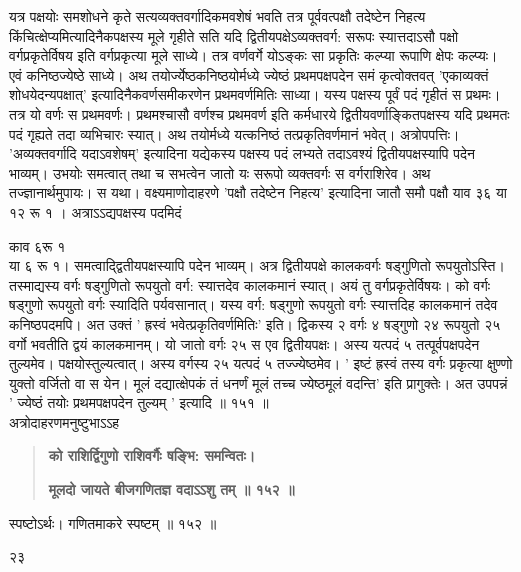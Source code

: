 \documentclass[11pt, openany]{book}
\begin{document}
\begin{sloppypar}
\hangindent=0.2in \hspace{0.2in}यत्र पक्षयोः समशोधने कृते सत्यव्यक्तवर्गादिकमवशेषं भवति तत्र पूर्ववत्पक्षौ तदेष्टेन निहत्य किंचित्क्षेप्यमित्यादिनैकपक्षस्य मूले गृहीते सति यदि द्वितीयपक्षेऽव्यक्तवर्ग: सरूपः स्यात्तदाऽसौ पक्षो वर्गप्रकृतेर्विषय इति वर्गप्रकृत्या मूले साध्ये। तत्र वर्णवर्गे योऽङ्कः सा प्रकृतिः कल्प्या रूपाणि क्षेपः कल्प्यः। एवं कनिष्ठज्येष्ठे साध्ये। अथ तयोर्ज्येष्ठकनिष्ठयोर्मध्ये ज्येष्ठं प्रथमपक्षपदेन समं कृत्वोक्तवत् 'एकाव्यक्तं शोधयेदन्यपक्षात्' इत्यादिनैकवर्णसमीकरणेन प्रथमवर्णमितिः साध्या। यस्य पक्षस्य पूर्वं पदं गृहीतं स प्रथमः। तत्र यो वर्णः स प्रथमवर्णः। प्रथमश्चासौ वर्णश्च प्रथमवर्ण इति कर्मधारये द्वितीयवर्णाङ्कितपक्षस्य यदि प्रथमतः पदं गृह्यते तदा व्यभिचारः स्यात्। अथ तयोर्मध्ये यत्कनिष्ठं तत्प्रकृतिवर्णमानं भवेत्। अत्रोपपत्तिः। 'अव्यक्तवर्गादि यदाऽवशेषम्' इत्यादिना यद्येकस्य पक्षस्य पदं लभ्यते तदाऽवश्यं द्वितीयपक्षस्यापि पदेन भाव्यम्। उभयोः समत्वात् तथा च सभत्वेन जातो यः सरूपो व्यक्तवर्गः स वर्गराशिरेव। अथ तज्ज्ञानार्थमुपायः। स यथा। वक्ष्यमाणोदाहरणे 'पक्षौ तदेष्टेन निहत्य' इत्यादिना जातौ समौ पक्षौ याव ३६ या १२ रू १ । अत्राऽऽद्यपक्षस्य पदमिदं

\hspace{3in}काव ६\hspace{0.5in}रू १\\

\hangindent=0.2in या ६ रू १। समत्वाद्द्वितीयपक्षस्यापि पदेन भाव्यम्। अत्र द्वितीयपक्षे कालकवर्गः षड्गुणितो रूपयुतोऽस्ति। तस्माद्यस्य वर्गः षड्गुणितो रूपयुतो वर्ग: स्यात्तदेव कालकमानं स्यात्। अयं तु वर्गप्रकृतेर्विषयः। को वर्गः षड्गुणो रूपयुतो वर्गः स्यादिति पर्यवसानात्। यस्य वर्ग: षड्गुणो रूपयुतो वर्गः स्यात्तदिह कालकमानं तदेव कनिष्ठपदमपि। अत उक्तं ' ह्रस्वं भवेत्प्रकृतिवर्णमितिः' इति। द्विकस्य २ वर्गः ४ षड्गुणो २४ रूपयुतो २५ वर्गो भवतीति द्वयं कालकमानम्। यो जातो वर्गः २५ स एव द्वितीयपक्षः। अस्य यत्पदं ५ तत्पूर्वपक्षपदेन तुल्यमेव। पक्षयोस्तुल्यत्वात्। अस्य वर्गस्य २५ यत्पदं ५ तज्ज्येष्ठमेव। ' इष्टं ह्रस्वं तस्य वर्गः प्रकृत्या क्षुण्णो युक्तो वर्जितो वा स येन। मूलं दद्यात्क्षेपकं तं धनर्णं मूलं तच्च ज्येष्ठमूलं वदन्ति' इति प्रागुक्तेः। अत उपपन्नं ' ज्येष्ठं तयोः प्रथमपक्षपदेन तुल्यम् ' इत्यादि ॥ १५१ ॥\\

\hangindent=0.2in \hspace{0.2in}अत्रोदाहरणमनुष्टुभाऽऽह\textendash

\begin{quote}
\hspace{1in}\textbf{को राशिर्द्विगुणो राशिवर्गैः षङ्भि: समन्वितः।}

\hspace{1in}\textbf{मूलदो जायते बीजगणितज्ञ वदाऽऽशु तम् ॥ १५२ ॥}
\end{quote}

\hangindent=0.2in \hspace{0.2in}स्पष्टोऽर्थः। गणितमाकरे स्पष्टम् ॥ १५२ ॥

\hangindent=0.2in \hspace{0.2in}२३
\end{sloppypar}
\thispagestyle{empty}
\newpage
\end{document}
